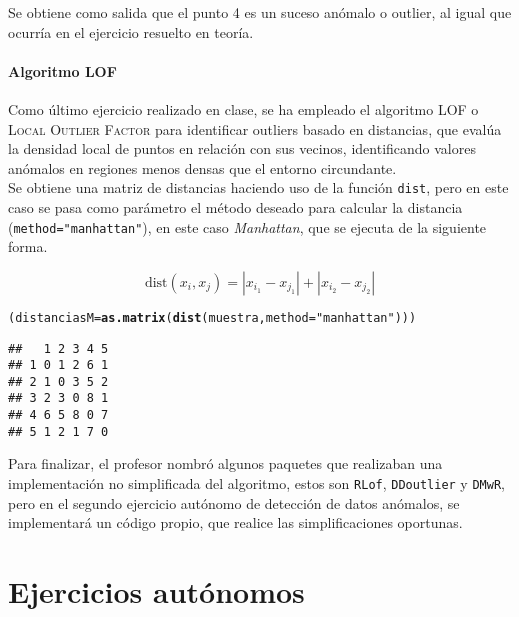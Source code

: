 \documentclass[12pt]{report}\usepackage[]{graphicx}\usepackage[dvipsnames]{xcolor}
\makeatletter
\newcommand{\hlstr}[1]{\textcolor[rgb]{0.192,0.494,0.8}{#1}}%
\newcommand{\hlstd}[1]{\textcolor[rgb]{0.345,0.345,0.345}{#1}}%
\newcommand{\hlkwb}[1]{\textcolor[rgb]{0.69,0.353,0.396}{#1}}%
\newcommand{\hlkwc}[1]{\textcolor[rgb]{0.333,0.667,0.333}{#1}}%
\newcommand{\hlkwd}[1]{\textcolor[rgb]{0.737,0.353,0.396}{\textbf{#1}}}%
\newenvironment{kframe}{%
 \def\at@end@of@kframe{}%
 \ifinner\ifhmode%
  \def\at@end@of@kframe{\end{minipage}}%
  \begin{minipage}{\columnwidth}%
 \fi\fi%
 \def\FrameCommand##1{\hskip\@totalleftmargin \hskip-\fboxsep
 \colorbox{shadecolor}{##1}\hskip-\fboxsep
     \hskip-\linewidth \hskip-\@totalleftmargin \hskip\columnwidth}%
 \MakeFramed {\advance\hsize-\width
   \@totalleftmargin\z@ \linewidth\hsize
   \@setminipage}}%
 {\par\unskip\endMakeFramed%
 \at@end@of@kframe}
\newenvironment{knitrout}{}{} %
\newcommand{\dt}{\text{dist}}
\makeatother
\begin{document}
					Se obtiene como salida que el punto 4 es un suceso anómalo o outlier, al igual que ocurría en el ejercicio resuelto en teoría.
				
				\subsubsection{Algoritmo LOF}
				
					Como último ejercicio realizado en clase, se ha empleado el algoritmo LOF o \textsc{Local Outlier Factor} para identificar outliers basado en distancias, que evalúa la densidad local de puntos en relación con sus vecinos, identificando valores anómalos en regiones menos densas que el entorno circundante.\\
					
					Se obtiene una matriz de distancias haciendo uso de la función \texttt{dist}, pero en este caso se pasa como parámetro el método deseado para calcular la distancia (\texttt{method="manhattan"}), en este caso \textit{Manhattan}, que se ejecuta de la siguiente forma.
					
					$$
					\dt(x_i, x_j) = |x_{i_1} - x_{j_1}| + |x_{i_2} - x_{j_2}|
					$$
					
\begin{knitrout}
\color{fgcolor}\begin{kframe}
\begin{alltt}
\hlstd{(distanciasM}\hlkwb{=}\hlkwd{as.matrix}\hlstd{(}\hlkwd{dist}\hlstd{(muestra,} \hlkwc{method}\hlstd{=}\hlstr{"manhattan"}\hlstd{)))}
\end{alltt}
\begin{verbatim}
##   1 2 3 4 5
## 1 0 1 2 6 1
## 2 1 0 3 5 2
## 3 2 3 0 8 1
## 4 6 5 8 0 7
## 5 1 2 1 7 0
\end{verbatim}
\end{kframe}
\end{knitrout}
					
					Para finalizar, el profesor nombró algunos paquetes que realizaban una implementación no simplificada del algoritmo, estos son \texttt{RLof}, \texttt{DDoutlier} y \texttt{DMwR}, pero en el segundo ejercicio autónomo de detección de datos anómalos, se implementará un código propio, que realice las simplificaciones oportunas.
	
	\chapter{Ejercicios autónomos}
	
\end{document}
